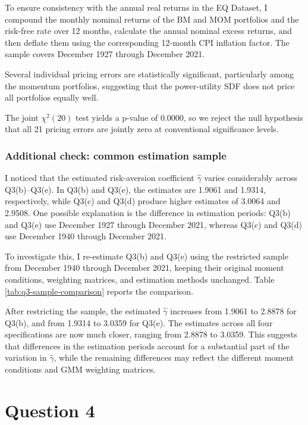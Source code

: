 \documentclass[11pt]{article}
\begin{document}
To ensure consistency with the annual real returns in the EQ Dataset, I compound the monthly nominal returns of the BM and MOM portfolios and the risk-free rate over 12 months, calculate the annual nominal excess returns, and then deflate them using the corresponding 12-month CPI inflation factor. The sample covers December 1927 through December 2021.

Several individual pricing errors are statistically significant, particularly among the momentum portfolios, suggesting that the power-utility SDF does not price all portfolios equally well.

The joint \(\chi^2(20)\) test yields a p-value of 0.0000, so we reject the null hypothesis that all 21 pricing errors are jointly zero at conventional significance levels. 


\FloatBarrier

\clearpage
\subsubsection*{Additional check: common estimation sample}
I noticed that the estimated risk-aversion coefficient \(\hat\gamma\) varies considerably across Q3(b)–Q3(e). In Q3(b) and Q3(e), the estimates are 1.9061 and 1.9314, respectively, while Q3(c) and Q3(d) produce higher estimates of 3.0064 and 2.9508. One possible explanation is the difference in estimation periods: Q3(b) and Q3(e) use December 1927 through December 2021, whereas Q3(c) and Q3(d) use December 1940 through December 2021.

To investigate this, I re-estimate Q3(b) and Q3(e) using the restricted sample from December 1940 through December 2021, keeping their original moment conditions, weighting matrices, and estimation methods unchanged. Table \ref{tab:q3-sample-comparison} reports the comparison.

After restricting the sample, the estimated \(\hat\gamma\) increases from 1.9061 to 2.8878 for Q3(b), and from 1.9314 to 3.0359 for Q3(e). The estimates across all four specifications are now much closer, ranging from 2.8878 to 3.0359. This suggests that differences in the estimation periods account for a substantial part of the variation in \(\hat\gamma\), while the remaining differences may reflect the different moment conditions and GMM weighting matrices.

\FloatBarrier

\clearpage
\section*{Question 4}
\end{document}
